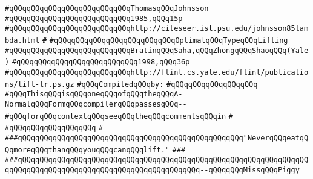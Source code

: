 \verb|#qQQqqQQqqQQqqQQqqQQqqQQqqQQqThomasqQQqJohnsson|\newline
\verb|#qQQqqQQqqQQqqQQqqQQqqQQqqQQq1985,qQQq15p|\newline
\verb|#qQQqqQQqqQQqqQQqqQQqqQQqqQQqhttp://citeseer.ist.psu.edu/johnsson85lambda.html|\newline
\verb|#|\newline
\verb|#qQQqqQQqqQQqqQQqqQQqqQQqqQQqOptimalqQQqTypeqQQqLifting|\newline
\verb|#qQQqqQQqqQQqqQQqqQQqqQQqqQQqBratinqQQqSaha,qQQqZhongqQQqShaoqQQq(Yale)|\newline
\verb|#qQQqqQQqqQQqqQQqqQQqqQQqqQQq1998,qQQq36p|\newline
\verb|#qQQqqQQqqQQqqQQqqQQqqQQqqQQqhttp://flint.cs.yale.edu/flint/publications/lift-tr.ps.gz|\newline
\newline
\verb|#qQQqCompiledqQQqby:|\newline
\verb|#qQQqqQQqqQQqqQQqqQQq|\newline
\newline
\newline
\newline
\verb|#qQQqThisqQQqisqQQqoneqQQqofqQQqtheqQQqA-NormalqQQqFormqQQqcompilerqQQqpassesqQQq--|\newline
\verb|#qQQqforqQQqcontextqQQqseeqQQqtheqQQqcommentsqQQqin|\newline
\verb|#|\newline
\verb|#qQQqqQQqqQQqqQQqqQQq|\newline
\verb|#|\newline
\newline
\newline
\newline
\newline
\verb|###qQQqqQQqqQQqqQQqqQQqqQQqqQQqqQQqqQQqqQQqqQQqqQQqqQQq"NeverqQQqeatqQQqmoreqQQqthanqQQqyouqQQqcanqQQqlift."|\newline
\verb|###|\newline
\verb|###qQQqqQQqqQQqqQQqqQQqqQQqqQQqqQQqqQQqqQQqqQQqqQQqqQQqqQQqqQQqqQQqqQQqqQQqqQQqqQQqqQQqqQQqqQQqqQQqqQQqqQQqqQQqqQQq--qQQqqQQqMissqQQqPiggy|\newline
\newline
\newline
\newline
